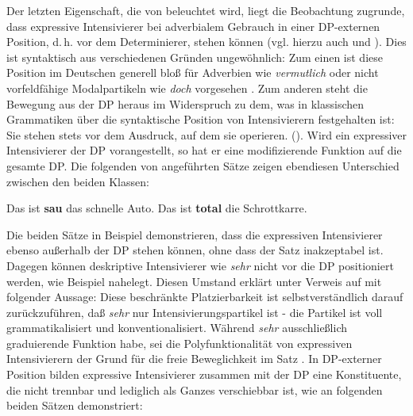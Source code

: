 Der letzten Eigenschaft, die von \citet[20]{Gutzmann.2019a} beleuchtet wird, liegt die Beobachtung zugrunde, dass expressive Intensivierer bei adverbialem Gebrauch in einer DP-externen Position, d.\,h. vor dem Determinierer, stehen können (vgl. hierzu auch \citealt[121ff.]{Meinunger.2009} und \citealt[]{Schmidlin.2015}). Dies ist syntaktisch aus verschiedenen Gründen ungewöhnlich: Zum einen ist diese Position im Deutschen generell bloß für Adverbien wie \textit{vermutlich} oder nicht vorfeldfähige Modalpartikeln wie \textit{doch} vorgesehen {\citep[vgl.][184]{Schmidlin.2015}}. Zum anderen steht die Bewegung aus der DP heraus im Widerspruch zu dem, was in klassischen Grammatiken über die syntaktische Position von Intensivierern festgehalten ist: \glqq{}Sie stehen stets vor dem Ausdruck, auf dem sie operieren.\grqq{} (\citealt[56]{Zifonun.1997}). Wird ein expressiver Intensivierer der DP vorangestellt, so hat er eine modifizierende Funktion auf die gesamte DP. Die folgenden von {\citet[20]{Gutzmann.2019a}} angeführten Sätze zeigen ebendiesen Unterschied zwischen den beiden Klassen:

\ea   \label{dpex}
\ea Das ist \textbf{sau} das schnelle Auto. \label{sau2}
\ex Das ist \textbf{total} die Schrottkarre. \label{total2}
 \z
 \z

\ea   \label{dpex02}
 \z
 \z
Die beiden Sätze in Beispiel  demonstrieren, dass die expressiven Intensivierer ebenso außerhalb der DP stehen können, ohne dass der Satz inakzeptabel ist. Dagegen können deskriptive Intensivierer wie \textit{sehr} nicht vor die DP positioniert werden, wie Beispiel  nahelegt. Diesen Umstand erklärt {\citet[16]{Os.1989}} unter Verweis auf \citet[22]{Abraham.1986} mit folgender Aussage: \glqq{}Diese beschränkte Platzierbarkeit ist selbstverständlich darauf zurückzuführen, daß \textit{sehr} nur Intensivierungspartikel ist - die Partikel ist voll grammatikalisiert \textelp{} und konventionalisiert\grqq{}. Während \textit{sehr} ausschließlich graduierende Funktion habe, sei die Polyfunktionalität von expressiven Intensivierern der Grund für die freie Beweglichkeit im Satz \citep[vgl.][16]{Os.1989}. In DP-externer Position bilden expressive Intensivierer zusammen mit der DP eine Konstituente, die nicht trennbar und lediglich als Ganzes verschiebbar ist, wie {\citet[144]{Gutzmann.2019a}} an folgenden beiden Sätzen demonstriert:

